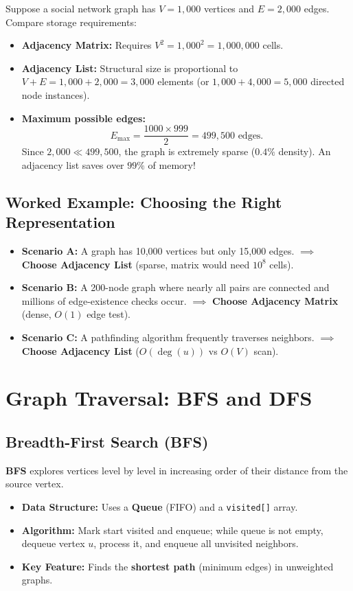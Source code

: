 \begin{tcolorbox}[title=\textbf{Worked Example: Memory Requirements}]
Suppose a social network graph has $V = 1,000$ vertices and $E = 2,000$ edges. Compare storage requirements:
\begin{itemize}
    \item \textbf{Adjacency Matrix:} Requires $V^2 = 1,000^2 = 1,000,000$ cells.
    \item \textbf{Adjacency List:} Structural size is proportional to $V + E = 1,000 + 2,000 = 3,000$ elements (or $1,000 + 4,000 = 5,000$ directed node instances).
    \item \textbf{Maximum possible edges:}
    \[
    E_{\max} = \frac{1000 \times 999}{2} = 499,500 \text{ edges.}
    \]
    Since $2,000 \ll 499,500$, the graph is extremely sparse ($0.4\%$ density). An adjacency list saves over $99\%$ of memory!
\end{itemize}
\end{tcolorbox}

\subsection{Worked Example: Choosing the Right Representation}
\begin{itemize}
    \item \textbf{Scenario A:} A graph has 10,000 vertices but only 15,000 edges. $\implies$ \textbf{Choose Adjacency List} (sparse, matrix would need $10^8$ cells).
    \item \textbf{Scenario B:} A 200-node graph where nearly all pairs are connected and millions of edge-existence checks occur. $\implies$ \textbf{Choose Adjacency Matrix} (dense, $O(1)$ edge test).
    \item \textbf{Scenario C:} A pathfinding algorithm frequently traverses neighbors. $\implies$ \textbf{Choose Adjacency List} ($O(\deg(u))$ vs $O(V)$ scan).
\end{itemize}

\section{Graph Traversal: BFS and DFS}

\subsection{Breadth-First Search (BFS)}
\textbf{BFS} explores vertices level by level in increasing order of their distance from the source vertex.
\begin{itemize}
    \item \textbf{Data Structure:} Uses a \textbf{Queue} (FIFO) and a \texttt{visited[]} array.
    \item \textbf{Algorithm:} Mark start visited and enqueue; while queue is not empty, dequeue vertex $u$, process it, and enqueue all unvisited neighbors.
    \item \textbf{Key Feature:} Finds the \textbf{shortest path} (minimum edges) in unweighted graphs.
\end{itemize}

